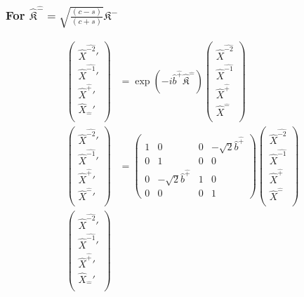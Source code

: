 \documentclass[]{article}
\numberwithin{equation}{section}
\begin{document}
{{\subsubsection{For $\hat{\mathfrak{K}}^{\hat{-}}=\sqrt{\frac{(c-s)}{(c+s)}}\mathfrak{K}^{{-}}$}
\begin{align}
\begin{pmatrix}
    \hat{X}^{\hat{-2}}'\\
    \hat{X}^{\hat{-1}}'\\
    \hat{X}^{\hat{+}}'\\
    \hat{X}_{\hat{-}}'\\
    \end{pmatrix}&= \exp{(-i\hat{b}^{\hat{+}}\hat{\mathfrak{K}}^{\hat{-}})}\begin{pmatrix}
    \hat{X}^{\hat{-2}}\\
    \hat{X}^{\hat{-1}}\\
    \hat{X}^{\hat{+}}\\
    \hat{X}^{\hat{-}}\\
    \end{pmatrix}\\
    \begin{pmatrix}
    \hat{X}^{\hat{-2}}'\\
    \hat{X}^{\hat{-1}}'\\
    \hat{X}^{\hat{+}}'\\
    \hat{X}^{\hat{-}}'\\
    \end{pmatrix}&= \begin{pmatrix}
        1&0&0&-\sqrt{2}\hat{b}^{\hat{+}}\\
        0&1&0&0\\
        0&-\sqrt{2}\hat{b}^{\hat{+}}&1&0\\
        0&0&0&1
    \end{pmatrix}\begin{pmatrix}
    \hat{X}^{\hat{-2}}\\
    \hat{X}^{\hat{-1}}\\
    \hat{X}^{\hat{+}}\\
    \hat{X}^{\hat{-}}\\
    \end{pmatrix}\\
    \begin{pmatrix}
    \hat{X}^{\hat{-2}}'\\
    \hat{X}^{\hat{-1}}'\\
    \hat{X}^{\hat{+}}'\\
    \hat{X}_{\hat{-}}'\\

\end{pmatrix}
\end{align}}}
\end{document}
